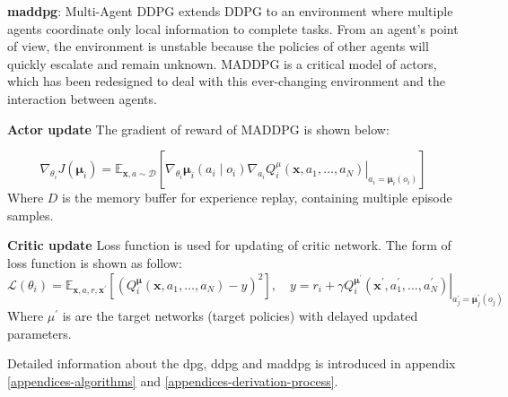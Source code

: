 \textbf{\gls{maddpg}}: Multi-Agent DDPG\parencite{maddpg2017} extends DDPG to an environment where multiple agents coordinate only local information to complete tasks. From an agent's point of view, the environment is unstable because the policies of other agents will quickly escalate and remain unknown. MADDPG is a critical model of actors, which has been redesigned to deal with this ever-changing environment and the interaction between agents. 

\textbf{Actor update} The gradient of reward of MADDPG is shown below:

\begin{equation}
\nabla_{\theta_{i}} J\left(\boldsymbol{\mu}_{i}\right)=\mathbb{E}_{\mathbf{x}, a \sim \mathcal{D}}\left[\left.\nabla_{\theta_{i}} \boldsymbol{\mu}_{i}\left(a_{i} \mid o_{i}\right) \nabla_{a_{i}} Q_{i}^{\mu}\left(\mathbf{x}, a_{1}, \ldots, a_{N}\right)\right|_{a_{i}=\boldsymbol{\mu}_{i}\left(o_{i}\right)}\right]
\end{equation}
Where $D$ is the memory buffer for experience replay, containing multiple episode samples.

\textbf{Critic update} Loss function is used for updating of critic network. The form of loss function is shown as follow:
\begin{equation}
\mathcal{L}\left(\theta_{i}\right)=\mathbb{E}_{\mathbf{x}, a, r, \mathbf{x}^{\prime}}\left[\left(Q_{i}^{\boldsymbol{\mu}}\left(\mathbf{x}, a_{1}, \ldots, a_{N}\right)-y\right)^{2}\right], \quad y=r_{i}+\left.\gamma Q_{i}^{\boldsymbol{\mu}^{\prime}}\left(\mathbf{x}^{\prime}, a_{1}^{\prime}, \ldots, a_{N}^{\prime}\right)\right|_{a_{j}^{\prime}=\boldsymbol{\mu}_{j}^{\prime}\left(o_{j}\right)}
\end{equation}
Where $\mu^{\prime}$ is are the target networks (target policies) with delayed updated parameters.

Detailed information about the \gls{dpg}, \gls{ddpg} and \gls{maddpg} is introduced in appendix \ref{appendices-algorithms} and \ref{appendices-derivation-process}.

